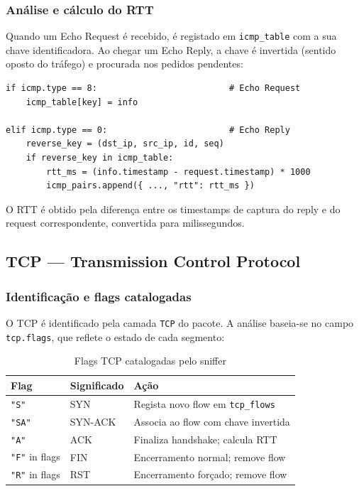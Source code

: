 \documentclass[a4paper,12pt]{article}
\begin{document}
\subsubsection{Análise e cálculo do RTT}
 
Quando um Echo Request é recebido, é registado em \texttt{icmp\_table} com a sua chave identificadora. Ao chegar um Echo Reply, a chave é invertida (sentido oposto do tráfego) e procurada nos pedidos pendentes:
 
\vspace{0.5em}

\begin{lstlisting}[style=python]
if icmp.type == 8:                          # Echo Request
    icmp_table[key] = info
 
elif icmp.type == 0:                        # Echo Reply
    reverse_key = (dst_ip, src_ip, id, seq)
    if reverse_key in icmp_table:
        rtt_ms = (info.timestamp - request.timestamp) * 1000
        icmp_pairs.append({ ..., "rtt": rtt_ms })
\end{lstlisting}
 
O RTT é obtido pela diferença entre os timestamps de captura do reply e do request correspondente, convertida para milissegundos.

\subsection{TCP — Transmission Control Protocol}
 
\subsubsection{Identificação e flags catalogadas}
 
O TCP é identificado pela camada \texttt{TCP} do pacote. A análise baseia-se no campo \texttt{tcp.flags}, que reflete o estado de cada segmento:
 
\begin{table}[H]
\centering
\begin{tabular}{lll}
\toprule
\textbf{Flag} & \textbf{Significado} & \textbf{Ação} \\
\midrule
\texttt{"S"}          & SYN     & Regista novo flow em \texttt{tcp\_flows} \\
\texttt{"SA"}         & SYN-ACK & Associa ao flow com chave invertida \\
\texttt{"A"}          & ACK     & Finaliza handshake; calcula RTT \\
\texttt{"F"} in flags & FIN     & Encerramento normal; remove flow \\
\texttt{"R"} in flags & RST     & Encerramento forçado; remove flow \\
\bottomrule
\end{tabular}
\caption{Flags TCP catalogadas pelo sniffer}
\end{table}
 
\end{document}
